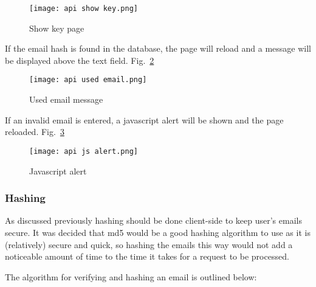             \begin{figure}[h]
                \centering
                \texttt{[image: api show key.png]}
                \caption{Show key page}
                \label{fig:api_show_key}
            \end{figure}

            If the email hash is found in the database, the page will reload and a message will be displayed above the text field. Fig.~\ref{fig:api_used_email}

            \begin{figure}[h]
                \centering
                \texttt{[image: api used email.png]}
                \caption{Used email message}
                \label{fig:api_used_email}
            \end{figure}

            If an invalid email is entered, a javascript alert will be shown and the page reloaded. Fig.~\ref{fig:api_js_alert}
            
            \begin{figure}[h]
                \centering
                \texttt{[image: api js alert.png]}
                \caption{Javascript alert}
                \label{fig:api_js_alert}
            \end{figure}
            

            \subsubsection{Hashing}
            As discussed previously hashing should be done client-side to keep user's emails secure. It was decided that md5 would be a good hashing algorithm to use as it is (relatively) secure and quick, so hashing the emails this way would not add a noticeable amount of time to the time it takes for a request to be processed.

            The algorithm for verifying and hashing an email is outlined below:

